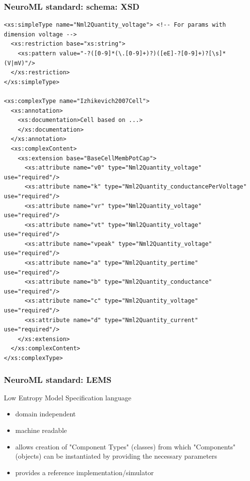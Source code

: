\begin{frame}[fragile,c]
  \frametitle{NeuroML standard: schema: XSD}
  \begin{center}
    \begin{verbatim}
<xs:simpleType name="Nml2Quantity_voltage"> <!-- For params with dimension voltage -->
  <xs:restriction base="xs:string">
    <xs:pattern value="-?([0-9]*(\.[0-9]+)?)([eE]-?[0-9]+)?[\s]*(V|mV)"/>
  </xs:restriction>
</xs:simpleType>

<xs:complexType name="Izhikevich2007Cell">
  <xs:annotation>
    <xs:documentation>Cell based on ...>
    </xs:documentation>
  </xs:annotation>
  <xs:complexContent>
    <xs:extension base="BaseCellMembPotCap">
      <xs:attribute name="v0" type="Nml2Quantity_voltage" use="required"/>
      <xs:attribute name="k" type="Nml2Quantity_conductancePerVoltage" use="required"/>
      <xs:attribute name="vr" type="Nml2Quantity_voltage" use="required"/>
      <xs:attribute name="vt" type="Nml2Quantity_voltage" use="required"/>
      <xs:attribute name="vpeak" type="Nml2Quantity_voltage" use="required"/>
      <xs:attribute name="a" type="Nml2Quantity_pertime" use="required"/>
      <xs:attribute name="b" type="Nml2Quantity_conductance" use="required"/>
      <xs:attribute name="c" type="Nml2Quantity_voltage" use="required"/>
      <xs:attribute name="d" type="Nml2Quantity_current" use="required"/>
    </xs:extension>
  </xs:complexContent>
</xs:complexType>
    \end{verbatim}
  \end{center}
\end{frame}
\begin{frame}[t]
  \frametitle{NeuroML standard: LEMS}
  \alert{L}ow \alert{E}ntropy \alert{M}odel \alert{S}pecification language
    \begin{itemize}
      \item domain independent
      \item machine readable
      \item allows creation of "Component Types" \alert{(classes)} from which "Components" \alert{(objects)} can be instantiated by providing the necessary parameters
      \item provides a \alert{reference implementation/simulator}
    \end{itemize}
\end{frame}
